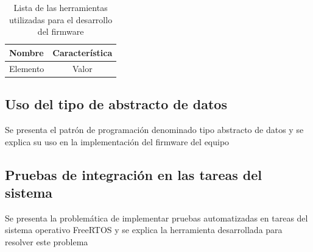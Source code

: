 \begin{table}[ht]
	\centering
	\caption{Lista de las herramientas utilizadas para el desarrollo del firmware}
	\begin{tabular}{l c}    
		\toprule
		\textbf{Nombre} 	& \textbf{Característica}	\\
		\midrule
		Elemento 			& Valor	\\
		\bottomrule
		\hline
	\end{tabular}
	\label{tab:HerramientasDesarrollo}
\end{table}

\subsection{Uso del tipo de abstracto de datos}

Se presenta el patrón de programación denominado tipo abstracto de datos y se explica su uso en la implementación del firmware del equipo

\subsection{Pruebas de integración en las tareas del sistema}

Se presenta la problemática de implementar pruebas automatizadas en tareas del sistema operativo FreeRTOS y se explica la herramienta desarrollada para resolver este problema
